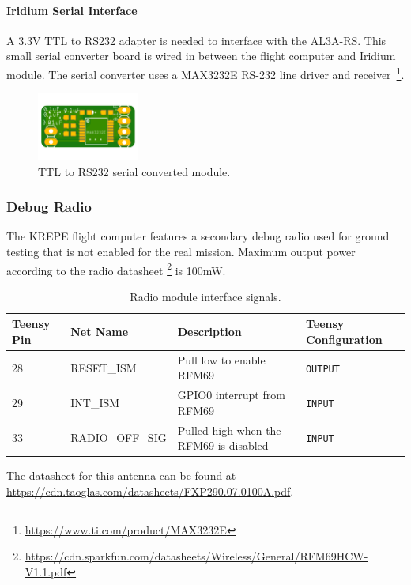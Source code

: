 \documentclass{article}
\begin{document}
\paragraph{Iridium Serial Interface}

A 3.3V TTL to RS232 adapter is needed to interface with the AL3A-RS. This small serial converter board is wired in between the flight computer and Iridium module. The serial converter uses a  MAX3232E RS-232 line driver and receiver~\footnote{\url{https://www.ti.com/product/MAX3232E}}.

\begin{figure}[H]
	\centering
	\includegraphics[width=0.3\textwidth]{images/serial-converter.png}
	\caption{TTL to RS232 serial converted module.}
	\label{fig:iridium-rf-specs}
\end{figure}



\subsubsection{Debug Radio}
The KREPE flight computer features a secondary debug radio used for ground testing that is not enabled for the real mission.  Maximum output power according to the radio datasheet \footnote{\url{https://cdn.sparkfun.com/datasheets/Wireless/General/RFM69HCW-V1.1.pdf}} is 100mW.
\begin{table}[H]
	\centering
	\caption{Radio module interface signals.}
	\label{tab:pins_radio}
	\begin{tabular}{l|l|l|l}
		Teensy Pin & Net Name  & Description   & Teensy Configuration \\
		\hline 
		28 & RESET\_ISM  &  Pull low to enable RFM69   & \texttt{OUTPUT} \\
		29 & INT\_ISM    &  GPIO0 interrupt from RFM69 & \texttt{INPUT} \\
		33 & RADIO\_OFF\_SIG & Pulled high when the RFM69 is disabled & \texttt{INPUT} \\
	\end{tabular}
\end{table}
The datasheet for this antenna can be found at  \url{https://cdn.taoglas.com/datasheets/FXP290.07.0100A.pdf}. 
  
\end{document}
